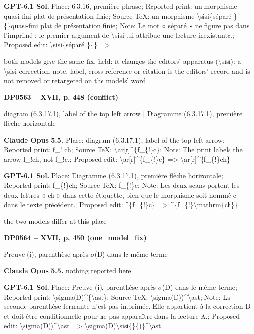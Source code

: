 \textbf{GPT-6.1 Sol.} Place: 6.3.16, première phrase; Reported print: un morphisme quasi-fini plat de présentation finie; Source TeX: un morphisme \textbackslash{}sisi\{séparé \}\{\}quasi-fini plat de présentation finie; Note: Le mot « séparé » ne figure pas dans l'imprimé ; le premier argument de \textbackslash{}sisi lui attribue une lecture inexistante.; Proposed edit: \textbackslash{}sisi\{séparé \}\{\} =\allowbreak > \par
both models give the same fix, held: it changes the editors' apparatus (\textbackslash{}sisi): a \textbackslash{}sisi correction, note, label, cross-reference or citation is the editors' record and is not removed or retargeted on the models' word\par
\par\noindent\hypertarget{DP0563}{}\textbf{DP0563 -- XVII, p. 448 (conflict)}\par
diagram (6.3.17.1), label of the top left arrow | Diagramme (6.3.17.1), première flèche horizontale\par
\textbf{Claude Opus 5.5.} Place: diagram (6.3.17.1), label of the top left arrow; Reported print: f\_! ch; Source TeX: \textbackslash{}ar[r]\textasciicircum{}\{f\_\{!\}c\}; Note: The print labels the arrow f\_!ch, not f\_!c.; Proposed edit: \textbackslash{}ar[r]\textasciicircum{}\{f\_\{!\}c\} =\allowbreak > \textbackslash{}ar[r]\textasciicircum{}\{f\_\{!\}ch\}\par
\textbf{GPT-6.1 Sol.} Place: Diagramme (6.3.17.1), première flèche horizontale; Reported print: f\_\{!\}ch; Source TeX: f\_\{!\}c; Note: Les deux scans portent les deux lettres « ch » dans cette étiquette, bien que le morphisme soit nommé c dans le texte précédent.; Proposed edit: \textasciicircum{}\{f\_\{!\}c\} =\allowbreak > \textasciicircum{}\{f\_\{!\}\textbackslash{}mathrm\{ch\}\}\par
the two models differ at this place\par
\par\noindent\hypertarget{DP0564}{}\textbf{DP0564 -- XVII, p. 450 (one\_model\_fix)}\par
Preuve (i), parenthèse après \ensuremath{\sigma}(D) dans le même terme\par
\textbf{Claude Opus 5.5.} nothing reported here\par
\textbf{GPT-6.1 Sol.} Place: Preuve (i), parenthèse après \ensuremath{\sigma}(D) dans le même terme; Reported print: \textbackslash{}sigma(D)\textasciicircum{}\{\textbackslash{}ast\}; Source TeX: \textbackslash{}sigma(D))\textasciicircum{}\textbackslash{}ast; Note: La seconde parenthèse fermante n'est pas imprimée. Elle appartient à la correction B et doit être conditionnelle pour ne pas apparaître dans la lecture A.; Proposed edit: \textbackslash{}sigma(D))\textasciicircum{}\textbackslash{}ast =\allowbreak > \textbackslash{}sigma(D)\textbackslash{}sisi\{\}\{)\}\textasciicircum{}\textbackslash{}ast\par

